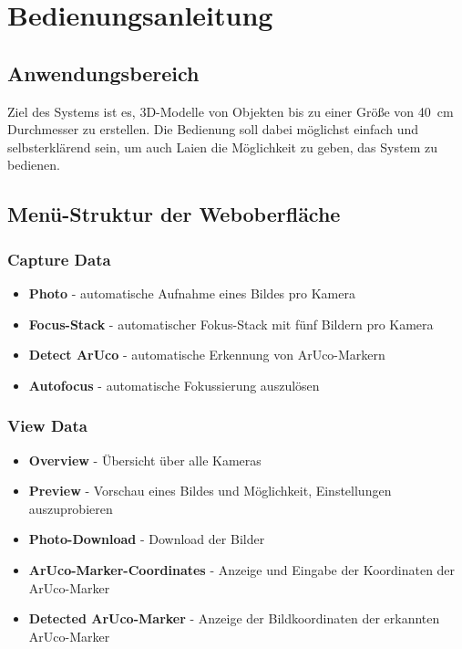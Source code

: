 \documentclass[./00PhotoBox.tex]{subfiles}
\begin{document}
\chapter{Bedienungsanleitung}
\label{ch:Bedienungsanleitung}


\section{Anwendungsbereich}
Ziel des Systems ist es, 3D-Modelle von Objekten bis zu einer Größe von \SI{40}{\centi\metre} Durchmesser zu erstellen. Die Bedienung soll dabei möglichst einfach und selbsterklärend sein, um auch Laien die Möglichkeit zu geben, das System zu bedienen.

\section{Menü-Struktur der Weboberfläche}
\subsection{\foreignlanguage{british}{Capture Data}}
\begin{itemize}
    \item \textbf{\foreignlanguage{british}{Photo}} - automatische Aufnahme eines Bildes pro Kamera
    \item \textbf{\foreignlanguage{british}{Focus-Stack}} - automatischer Fokus-Stack mit fünf Bildern pro Kamera
    \item \textbf{\foreignlanguage{british}{Detect ArUco}} - automatische Erkennung von ArUco-Markern
    \item \textbf{\foreignlanguage{british}{Autofocus}} - automatische Fokussierung auszulösen
\end{itemize}

\subsection{\foreignlanguage{british}{View Data}}
\begin{itemize}
    \item \textbf{\foreignlanguage{british}{Overview}} - Übersicht über alle Kameras
    \item \textbf{\foreignlanguage{british}{Preview}} - Vorschau eines Bildes und Möglichkeit, Einstellungen auszuprobieren
    \item \textbf{\foreignlanguage{british}{Photo-Download}} - Download der Bilder
    \item \textbf{\foreignlanguage{british}{ArUco-Marker-Coordinates}} - Anzeige und Eingabe der Koordinaten der ArUco-Marker
    \item \textbf{\foreignlanguage{british}{Detected ArUco-Marker}} - Anzeige der Bildkoordinaten der erkannten ArUco-Marker
\end{itemize}
\end{document}
